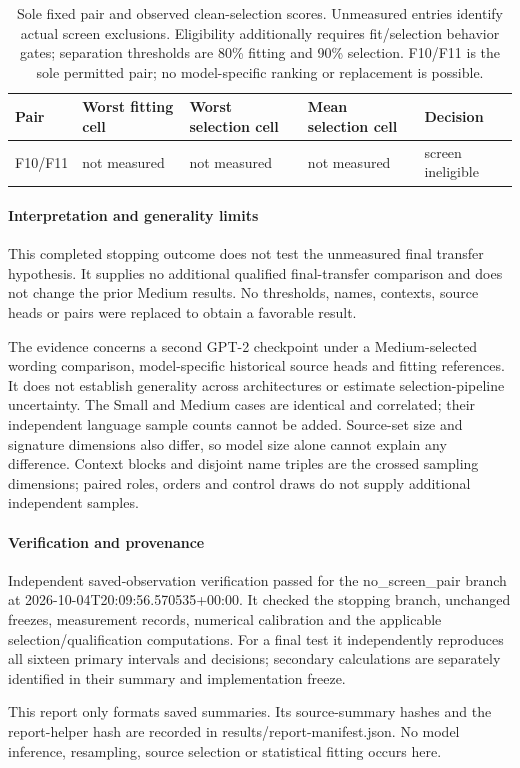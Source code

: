 \begin{table}[htbp]
\centering\footnotesize
\caption{Sole fixed pair and observed clean-selection scores. Unmeasured entries identify actual screen exclusions. Eligibility additionally requires fit/selection behavior gates; separation thresholds are 80\% fitting and 90\% selection. F10/F11 is the sole permitted pair; no model-specific ranking or replacement is possible.}
\label{tab:b009-selection}
\begin{tabularx}{\linewidth}{@{}YYYYY@{}}
\toprule
Pair & Worst fitting cell & Worst selection cell & Mean selection cell & Decision \\
\midrule
F10/F11 & not measured & not measured & not measured & screen ineligible \\
\bottomrule
\end{tabularx}
\end{table}

\paragraph{Interpretation and generality limits}

This completed stopping outcome does not test the unmeasured final transfer hypothesis. It supplies no additional qualified final-transfer comparison and does not change the prior Medium results. No thresholds, names, contexts, source heads or pairs were replaced to obtain a favorable result.

The evidence concerns a second GPT-2 checkpoint under a Medium-selected wording comparison, model-specific historical source heads and fitting references. It does not establish generality across architectures or estimate selection-pipeline uncertainty. The Small and Medium cases are identical and correlated; their independent language sample counts cannot be added. Source-set size and signature dimensions also differ, so model size alone cannot explain any difference. Context blocks and disjoint name triples are the crossed sampling dimensions; paired roles, orders and control draws do not supply additional independent samples.

\paragraph{Verification and provenance}

Independent saved-observation verification passed for the no\_screen\_pair branch at 2026-10-04T20:09:56.570535+00:00. It checked the stopping branch, unchanged freezes, measurement records, numerical calibration and the applicable selection/qualification computations. For a final test it independently reproduces all sixteen primary intervals and decisions; secondary calculations are separately identified in their summary and implementation freeze.

This report only formats saved summaries. Its source-summary hashes and the report-helper hash are recorded in results/report-manifest.json. No model inference, resampling, source selection or statistical fitting occurs here.
